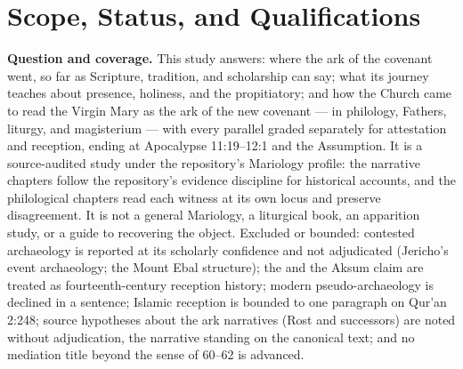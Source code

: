 \sectionguard
\section{Scope, Status, and Qualifications}

\textbf{Question and coverage.} This study answers: where the ark of the
covenant went, so far as Scripture, tradition, and scholarship can say;
what its journey teaches about presence, holiness, and the propitiatory;
and how the Church came to read the Virgin Mary as the ark of the new
covenant --- in philology, Fathers, liturgy, and magisterium --- with
every parallel graded separately for attestation and reception, ending at
Apocalypse 11:19--12:1 and the Assumption. It is a source-audited study
under the repository's Mariology profile: the narrative chapters follow the
repository's evidence discipline for historical accounts, and the
philological chapters read each witness at its own locus and preserve
disagreement. It is not a general Mariology, a liturgical book, an
apparition study, or a guide to recovering the object. Excluded or
bounded: contested archaeology is reported at its scholarly confidence
and not adjudicated (Jericho's event archaeology; the Mount Ebal
structure); the  and the Aksum claim are treated as
fourteenth-century reception history; modern pseudo-archaeology is
declined in a sentence; Islamic reception is bounded to one paragraph on
Qur'an 2:248; source hypotheses about the ark narratives (Rost and
successors) are noted without adjudication, the narrative standing on the
canonical text; and no mediation title beyond the sense of  60--62 is advanced.

